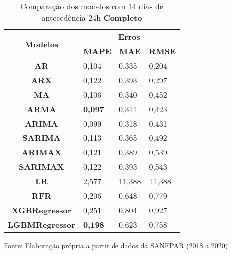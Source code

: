 \begin{table}[H]
	\centering
	\caption{Comparação dos modelos com 14 dias de antecedência 24h \textbf{Completo} }\label{tb:30-24cm}
	\begin{tabular}{@{}clll@{}}
		\toprule
		\multirow{2}{*}{\textbf{Modelos}} & \multicolumn{3}{c}{\textbf{Erros}}                                                                       \\ \cmidrule(l){2-4} 
		& \multicolumn{1}{c}{\textbf{MAPE}} & \multicolumn{1}{c}{\textbf{MAE}} & \multicolumn{1}{c}{\textbf{RMSE}} \\ \hline
\textbf{AR}                       & 0,104                             & 0,335                            & 0,204                             \\
\textbf{ARX}                      & 0,122                             & 0,393                            & 0,297                             \\
\textbf{MA}                       & 0,106                             & 0,340                            & 0,452                             \\
\textbf{ARMA}                     &\textbf{ 0,097}                             & 0,311                            & 0,423                             \\
\textbf{ARIMA}                    & 0,099                             & 0,318                            & 0,431                             \\
\textbf{SARIMA}                   & 0,113                             & 0,365                            & 0,492                             \\
\textbf{ARIMAX}                   & 0,121                             & 0,389                            & 0,539                             \\
\textbf{SARIMAX}                  & 0,122                             & 0,393                            & 0,543                             \\
\textbf{LR}                       & 2,577                             & 11,388                           & 11,388                            \\
\textbf{RFR}                      & 0,206                             & 0,648                            & 0,779                             \\
\textbf{XGBRegressor}             & 0,251                             & 0,804                            & 0,927                             \\
\textbf{LGBMRegressor}            & \textbf{0,198}                             & 0,623                            & 0,758                             \\ \bottomrule
	\end{tabular}

Fonte: Elaboração própria a partir de dados da SANEPAR (2018 a 2020)
\end{table}


